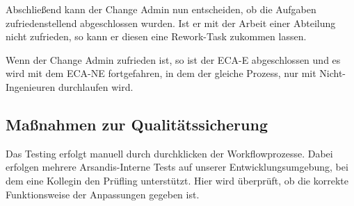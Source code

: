 Abschließend kann der Change Admin nun entscheiden, ob die Aufgaben zufriedenstellend abgeschlossen wurden.
Ist er mit der Arbeit einer Abteilung nicht zufrieden, so kann er diesen eine \glqq Rework\grqq{}-Task zukommen lassen.

Wenn der Change Admin zufrieden ist, so ist der ECA-E abgeschlossen und es wird mit dem ECA-NE fortgefahren, in dem der gleiche Prozess, nur mit Nicht-Ingenieuren durchlaufen wird.

\subsection{Maßnahmen zur Qualitätssicherung}
Das Testing erfolgt manuell durch \glqq durchklicken\grqq{} der Workflowprozesse.
Dabei erfolgen mehrere Arsandis-Interne Tests auf unserer Entwicklungsumgebung, bei dem eine Kollegin den Prüfling unterstützt.
Hier wird überprüft, ob die korrekte Funktionsweise der Anpassungen gegeben ist.